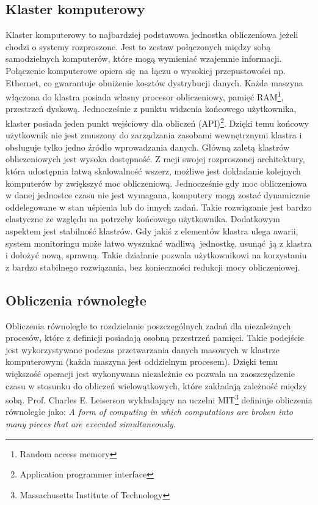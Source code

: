 \subsection{Klaster komputerowy}
Klaster komputerowy to najbardziej podstawowa jednostka obliczeniowa jeżeli chodzi o systemy rozproszone. Jest to zestaw połączonych między sobą samodzielnych komputerów, które mogą wymieniać wzajemnie informacji. Połączenie komputerowe opiera się na łączu o wysokiej przepustowości np. Ethernet, co gwarantuje obniżenie kosztów dystrybucji danych. Każda maszyna włączona do klastra posiada własny procesor obliczeniowy, pamięć RAM\footnote{Random access memory}, przestrzeń dyskową. Jednocześnie z punktu widzenia końcowego użytkownika, klaster posiada jeden punkt wejściowy dla obliczeń (API)\footnote{Application programmer interface}. Dzięki temu końcowy użytkownik nie jest zmuszony do zarządzania zasobami wewnętrznymi klastra i obsługuje tylko jedno źródło wprowadzania danych\cite{cluster_grid_cloud}. 
\newline Główną zaletą klastrów obliczeniowych jest wysoka dostępność. Z racji swojej rozproszonej architektury, która udostępnia łatwą skalowalność wszerz, możliwe jest dokładanie kolejnych komputerów by zwiększyć moc obliczeniową. Jednocześnie gdy moc obliczeniowa w danej jednostce czasu nie jest wymagana, komputery mogą zostać dynamicznie oddelegowane w stan uśpienia lub do innych zadań. Takie rozwiązanie jest bardzo elastyczne ze względu na potrzeby końcowego użytkownika. Dodatkowym aspektem jest stabilność klastrów. Gdy jakiś z elementów klastra ulega awarii, system monitoringu może łatwo wyszukać wadliwą jednostkę, usunąć ją z klastra i dołożyć nową, sprawną. Takie działanie pozwala użytkownikowi na korzystaniu z bardzo stabilnego rozwiązania, bez konieczności redukcji mocy obliczeniowej\cite{cluster_grid_cloud_detailed_comparison}.
\subsection{Obliczenia równoległe}
Obliczenia równoległe to rozdzielanie poszczególnych zadań dla niezależnych procesów, które z definicji posiadają osobną przestrzeń pamięci. Takie podejście jest wykorzystywane podczas przetwarzania danych masowych w klastrze komputerowym (każda maszyna jest oddzielnym procesem). Dzięki temu większość operacji jest wykonywana niezależnie co pozwala na zaoszczędzenie czasu w stosunku do obliczeń wielowątkowych, które zakładają zależność między sobą. Prof. Charles E. Leiserson wykładający na uczelni MIT\footnote{Massachusetts Institute of Technology} definiuje obliczenia równoległe jako:
\newline \textit{A form of computing in which computations are broken into many pieces that are executed simultaneously}\cite{mit_presentation}.
